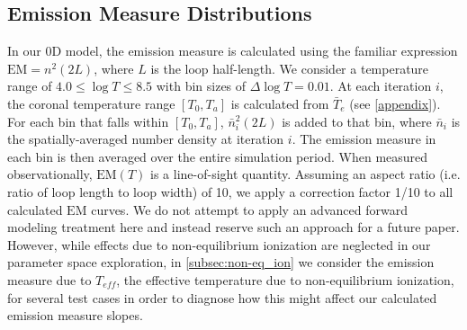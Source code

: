 \documentclass[apj]{emulateapj}
\begin{document}
	\subsection{Emission Measure Distributions}
	\label{subsec:em_dist}
	\par In our 0D model, the emission measure is calculated using the familiar expression $\mathrm{EM}=n^2(2L)$, where $L$ is the loop half-length. We consider a temperature range of $4.0\le\log{T}\le8.5$ with bin sizes of $\Delta\log{T}=0.01$. At each iteration $i$, the coronal temperature range $[T_0,T_a]$ is calculated from $\bar{T}_e$ (see \autoref{appendix}). For each bin that falls within $[T_0,T_a]$, $\bar{n}_i^2(2L)$ is added to that bin, where $\bar{n}_i$ is the spatially-averaged number density at iteration $i$. The emission measure in each bin is then averaged over the entire simulation period. When measured observationally, $\mathrm{EM}(T)$ is a line-of-sight quantity. Assuming an aspect ratio (i.e. ratio of loop length to loop width) of 10, we apply a correction factor 1/10 to all calculated $\mathrm{EM}$ curves. We do not attempt to apply an advanced forward modeling treatment here and instead reserve such an approach for a future paper. However, while effects due to non-equilibrium ionization are neglected in our parameter space exploration, in \autoref{subsec:non-eq_ion} we consider the emission measure due to $T_{eff}$, the effective temperature due to non-equilibrium ionization, for several test cases in order to diagnose how this might affect our calculated emission measure slopes.
\end{document}
